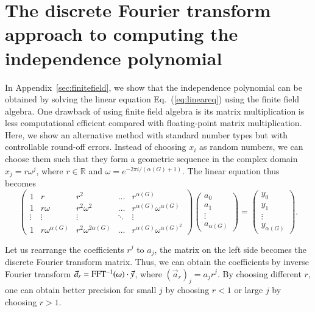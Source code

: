 \documentclass[onefignum, onetabnum]{siamart190516}
\newcommand{\<}{\langle}
\renewcommand{\>}{\rangle}
\newcommand{\Eq}[1]{Eq.~(\ref{#1})}
\newcommand{\App}[1]{Appendix~\ref{#1}}
\begin{document}
\section{The discrete Fourier transform approach to computing the independence polynomial}\label{sec:fft}

In  \App{sec:finitefield}, we show that the independence polynomial can be obtained by solving the linear equation \Eq{eq:lineareq} using the finite field algebra.
One drawback of using finite field algebra is its matrix multiplication is less computational efficient compared with floating-point matrix multiplication.
Here, we show an alternative method with standard number types but with controllable round-off errors.
Instead of choosing $x_{i}$ as random numbers, we can choose them such that they form a geometric sequence in the complex domain $x_j = r\omega^j$, where $r \in \mathbb{R}$ and $\omega = e^{-2\pi i/( \alpha(G)+1)}$. The linear equation thus becomes
\begin{equation}
\left(\begin{matrix}
1 & r & r^2 & \ldots & r^{\alpha(G)} \\
1 & r\omega & r^2\omega^2 & \ldots & r^{\alpha(G)} \omega^{\alpha(G)} \\
\vdots & \vdots & \vdots &\ddots & \vdots \\
1 & r\omega^{\alpha(G)} & r^2\omega^{2{\alpha(G)}} & \ldots & r^{\alpha(G)}\omega^{{\alpha(G)}^2}
\end{matrix}\right)
\left(\begin{matrix}
a_0 \\ a_1 \\ \vdots \\ a_{\alpha(G)}
\end{matrix}\right)
= \left(\begin{matrix}
y_0 \\ y_1 \\ \vdots \\ y_{\alpha(G)}
\end{matrix}\right).
\end{equation}

Let us rearrange the coefficients $r^j$ to $a_j$, the matrix on the left side becomes the discrete Fourier transform matrix. Thus, we can obtain the coefficients by inverse Fourier transform $\vec a_r = {\rm FFT^{-1}}(\omega) \cdot \vec y$, where $(\vec a_r)_j = a_j r ^j$.
By choosing different $r$, one can obtain better precision for small $j$ by choosing $r<1$ or large $j$ by choosing $r>1$.
\end{document}
